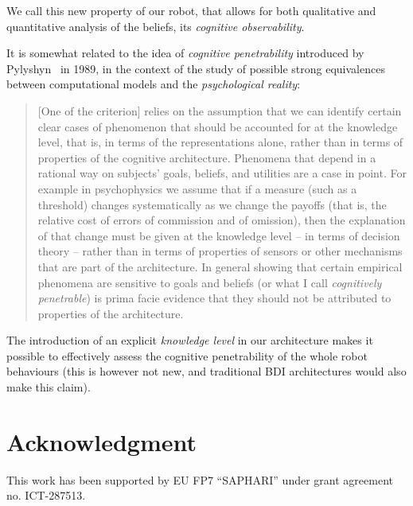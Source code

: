 \documentclass[letterpaper, 10 pt, conference]{ieeeconf}  %
\begin{document}
We call this new property of our robot, that allows for both qualitative and
quantitative analysis of the beliefs, its \emph{cognitive observability}.

It is somewhat related to the idea of \emph{cognitive penetrability} introduced
by Pylyshyn~\cite{Pylyshyn1989} in 1989, in the context of the study of
possible strong equivalences between computational models and the
\emph{psychological reality}:

\begin{quote}

    [One of the criterion] relies on the assumption that we can identify
    certain clear cases of phenomenon that should be accounted for at the
    knowledge level, that is, in terms of the representations alone, rather
    than in terms of properties of the cognitive architecture. Phenomena that
    depend in a rational way on subjects' goals, beliefs, and utilities are a
    case in point. For example in psychophysics we assume that if a measure
    (such as a threshold) changes systematically as we change the payoffs (that
    is, the relative cost of errors of commission and of omission), then the
    explanation of that change must be given at the knowledge level -- in terms
    of decision theory -- rather than in terms of properties of sensors or
    other mechanisms that are part of the architecture. In general showing that
    certain empirical phenomena are sensitive to goals and beliefs (or what I
    call \emph{cognitively penetrable}) is prima facie evidence that they
    should not be attributed to properties of the architecture.

\end{quote}

The introduction of an explicit \emph{knowledge level} in our architecture
makes it possible to effectively assess the cognitive penetrability of the
whole robot behaviours (this is however not new, and traditional BDI
architectures would also make this claim).

\section*{Acknowledgment}

This work has been supported by EU FP7 ``SAPHARI'' under grant agreement no. ICT-287513.



\end{document}
